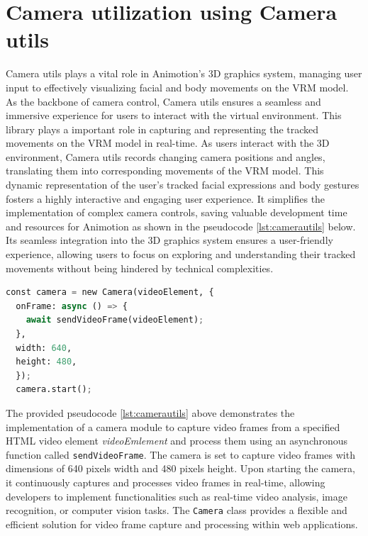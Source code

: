 \section{Camera utilization using Camera utils}
Camera utils plays a vital role in Animotion's 3D graphics system, managing user input to effectively 
visualizing facial and body movements on the VRM model. As the backbone of camera control, Camera utils 
ensures a seamless and immersive experience for users to interact with the virtual environment.
This library plays a important role in capturing and representing the tracked movements on the VRM 
model in real-time. As users interact with the 3D environment, Camera utils records changing camera 
positions and angles, translating them into corresponding movements of the VRM model. This dynamic 
representation of the user's tracked facial expressions and body gestures fosters a highly 
interactive and engaging user experience. It simplifies the implementation of complex camera controls, 
saving valuable development time and resources for Animotion as shown in the pseudocode \ref{lst:camerautils} below. Its seamless integration into the 3D 
graphics system ensures a user-friendly experience, allowing users to focus on exploring and 
understanding their tracked movements without being hindered by technical complexities. \cite{camerautils}

\begin{lstlisting}[language=Python,caption=Camera utilization using CameraUtils,label=lst:camerautils]
  const camera = new Camera(videoElement, {
  onFrame: async () => {
    await sendVideoFrame(videoElement);
  },
  width: 640,
  height: 480,
  });
  camera.start();
\end{lstlisting}

The provided pseudocode \ref{lst:camerautils} above demonstrates the implementation of a camera module to capture video frames from 
a specified HTML video element \emph{videoEmlement} and process them using an asynchronous 
function called \texttt{sendVideoFrame}. The camera is set to capture video frames 
with dimensions of 640 pixels width and 480 pixels height. Upon starting the camera, it continuously captures 
and processes video frames in real-time, allowing developers to implement functionalities such as real-time video 
analysis, image recognition, or computer vision tasks. The \texttt{Camera} class provides a flexible and efficient 
solution for video frame capture and processing within web applications.

